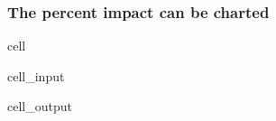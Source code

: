 \documentclass[letterpaper,10pt,english]{jupyterBook}
\begin{document}
\subsubsection{The percent impact can be charted}
\label{\detokenize{content/06_ModelAnalytics/Attribution:the-percent-impact-can-be-charted}}
\begin{sphinxuseclass}{cell}\begin{sphinxVerbatimInput}

\begin{sphinxuseclass}{cell_input}
\begin{sphinxVerbatim}[commandchars=\\\{\}]
\end{sphinxVerbatim}

\end{sphinxuseclass}\end{sphinxVerbatimInput}
\begin{sphinxVerbatimOutput}

\begin{sphinxuseclass}{cell_output}
\noindent{}

\end{sphinxuseclass}\end{sphinxVerbatimOutput}

\end{sphinxuseclass}
\end{document}
